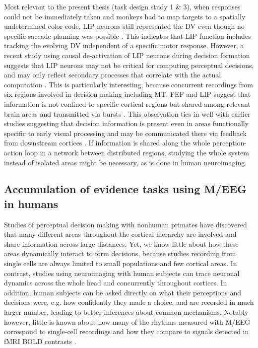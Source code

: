Most relevant to the present thesis (task design study 1 \& 3), when responses could not be immediately taken and monkeys had to map targets to a spatially undetermined color-code, LIP neurons still represented the DV even though no specific saccade planning was possible \parencite{Bennur2011}. This indicates that LIP function includes tracking the evolving DV independent of a specific motor response. However, a recent study using causal de-activation of LIP neurons during decision formation suggests that LIP neurons may not be critical for computing perceptual decisions, and may only reflect secondary processes that correlate with the actual computation \parencite{Katz2016}. This is particularly interesting, because concurrent recordings from six regions involved in decision making including MT, FEF and LIP suggest that information is not confined to specific cortical regions but shared among relevant brain areas and transmitted via bursts \parencite{Siegel2015}. This observation ties in well with earlier studies suggesting that decision information is present even in areas functionally specific to early visual processing and may be communicated there via feedback from downstream cortices \parencite{Donner2008,Nienborg2009,Siegel2011}. If information is shared along the whole perception-action loop in a network between distributed regions, studying the whole system instead of isolated areas might be necessary, as is done in human neuroimaging. 

\subsection{Accumulation of evidence tasks using M/EEG in humans}
Studies of perceptual decision making with nonhuman primates have discovered that many different areas throughout the cortical hierarchy are involved and share information across large distances. Yet, we know little about how these areas dynamically interact to form decisions, because studies recording from single cells are always limited to small populations and few cortical areas. In contrast, studies using neuroimaging with human subjects can trace neuronal dynamics across the whole head and concurrently throughout cortices. In addition, human subjects can be asked directly on what their perceptions and decisions were, e.g. how confidently they made a choice, and are recorded in much larger number, leading to better inferences about common mechanisms. Notably however, little is known about how many of the rhythms measured with M/EEG correspond to single-cell recordings and how they compare to signals detected in fMRI BOLD contrasts \parencite{Buzsaki2012,Jann2010,Keller2013,Lee2014,Logothetis2001,Scheeringa2011,Whittingstall2009}. 

